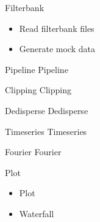 \documentclass{beamer}
\begin{document}
\begin{frame}{Filterbank}
	\begin{itemize}
		\item Read filterbank files
		\item Generate mock data
	\end{itemize}
\end{frame}

\begin{frame}{Pipeline}
	Pipeline
\end{frame}

\begin{frame}{Clipping}
	Clipping
\end{frame}

\begin{frame}{Dedisperse}
	Dedisperse
\end{frame}

\begin{frame}{Timeseries}
	Timeseries
\end{frame}

\begin{frame}{Fourier}
	Fourier
\end{frame}

\begin{frame}{Plot}
	\begin{itemize}
		\item Plot
		\item Waterfall
	\end{itemize}
\end{frame}
\end{document}
